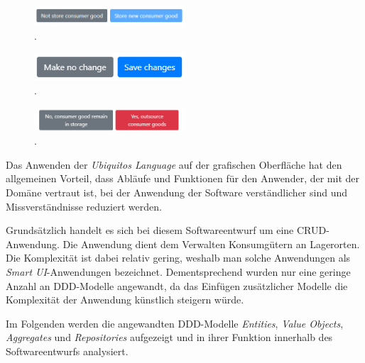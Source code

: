 \begin{figure}[H]
	\centering
	\includegraphics[width=0.5\textwidth]{Bilder/gui/Ubiquitous Language/store-buttons.PNG}
	\caption[Buttons zum Bestätigen des Einlagerns eines Konsumguts.]{.}
	\label{fig:gui-button-einlagern}
\end{figure}

\begin{figure}[H]
	\centering
	\includegraphics[width=0.5\textwidth]{Bilder/gui/Ubiquitous Language/edit-buttons.PNG}
	\caption[Buttons zum Bestätigen von Änderungen der Attribute eines Konsumguts.]{.}
	\label{fig:gui-button-aendern}
\end{figure}

\begin{figure}[H]
	\centering
	\includegraphics[width=0.5\textwidth]{Bilder/gui/Ubiquitous Language/outsource-buttons.PNG}
	\caption[Buttons zum Bestätigen des Auslagern eines Konsumguts.]{.}
	\label{fig:gui-button-auslagern}
\end{figure}

Das Anwenden der \textit{Ubiquitos Language} auf der grafischen Oberfläche hat den allgemeinen Vorteil, dass Abläufe und Funktionen für den Anwender, der mit der Domäne vertraut ist, bei der Anwendung der Software verständlicher sind und Missverständnisse reduziert werden.

Grundsätzlich handelt es sich bei diesem Softwareentwurf um eine \ac{CRUD}-Anwendung.
Die Anwendung dient dem Verwalten Konsumgütern an Lagerorten.
Die Komplexität ist dabei relativ gering, weshalb man solche Anwendungen als \textit{Smart UI}-Anwendungen bezeichnet.
Dementsprechend wurden nur eine geringe Anzahl an \ac{DDD}-Modelle angewandt, da das Einfügen zusätzlicher Modelle die Komplexität der Anwendung künstlich steigern würde.

Im Folgenden werden die angewandten \ac{DDD}-Modelle \textit{Entities}, \textit{Value Objects}, \textit{Aggregates} und \textit{Repositories} aufgezeigt und in ihrer Funktion innerhalb des Softwareentwurfs analysiert.

